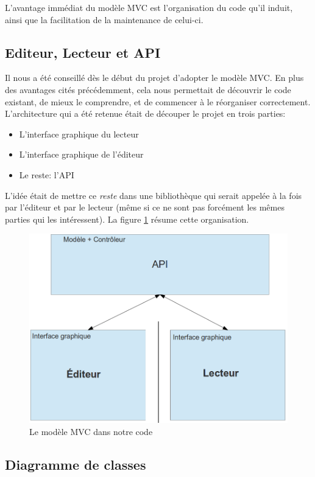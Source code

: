 \documentclass[a4paper,11pt]{article}
\begin{document}
L'avantage immédiat du modèle MVC est l'organisation du code qu'il induit, ainsi que la facilitation de la maintenance de celui-ci.

\subsection{Editeur, Lecteur et API}

Il nous a été conseillé dès le début du projet d'adopter le modèle MVC. En plus des avantages cités précédemment, cela nous permettait de découvrir le code existant, de mieux le comprendre, et de commencer à le réorganiser correctement. L'architecture qui a été retenue était de découper le projet en trois parties:
\begin{itemize}
 \item L'interface graphique du lecteur
 \item L'interface graphique de l'éditeur
 \item Le reste: l'API
\end{itemize}
L'idée était de mettre ce \textit{reste} dans une bibliothèque qui serait appelée à la fois par l'éditeur et par le lecteur (même si ce ne sont pas forcément les mêmes parties qui les intéressent). La figure \ref{mvc} résume cette organisation.

\begin{figure}[H]
\begin{center}
\includegraphics[width=450px]{mvc.png}
\caption{Le modèle MVC dans notre code}
\label{mvc}
\end{center}
\end{figure}

\subsection{Diagramme de classes}
\end{document}
